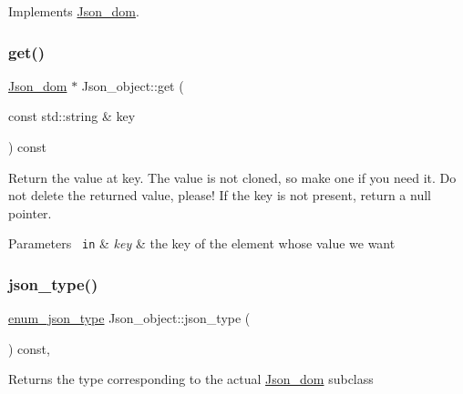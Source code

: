 Implements \mbox{\hyperlink{classJson__dom_a779b8c6ac78329409f8be12e6d082782}{Json\+\_\+dom}}.

\mbox{\label{classJson__object_aadf27479595825213a12ab1a1f21ae2f}} 
\subsubsection{\texorpdfstring{get()}{get()}}
{\footnotesize\ttfamily \mbox{\hyperlink{classJson__dom}{Json\+\_\+dom}} $\ast$ Json\+\_\+object\+::get (\begin{DoxyParamCaption}\item[{const std\+::string \&}]{key }\end{DoxyParamCaption}) const}

Return the value at key. The value is not cloned, so make one if you need it. Do not delete the returned value, please! If the key is not present, return a null pointer.


\begin{DoxyParams}[1]{Parameters}
\mbox{\texttt{ in}}  & {\em key} & the key of the element whose value we want \\
\hline
\end{DoxyParams}
\mbox{\label{classJson__object_aa55889bf5bb56bea13f7ab005893637e}} 
\subsubsection{\texorpdfstring{json\+\_\+type()}{json\_type()}}
{\footnotesize\ttfamily \mbox{\hyperlink{classJson__dom_af37eed7dfe1da1d6507d3ab85320eb03}{enum\+\_\+json\+\_\+type}} Json\+\_\+object\+::json\+\_\+type (\begin{DoxyParamCaption}{ }\end{DoxyParamCaption}) const\hspace{0.3cm}{\ttfamily [inline]}, {\ttfamily [virtual]}}

\begin{DoxyReturn}{Returns}
the type corresponding to the actual \mbox{\hyperlink{classJson__dom}{Json\+\_\+dom}} subclass 
\end{DoxyReturn}


